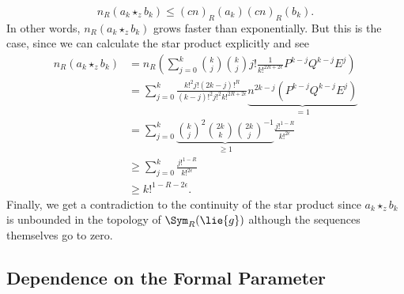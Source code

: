 \begin{example}
    \begin{equation*}
        n_R(a_k \star_z b_k)
        \leq
        (c n)_R(a_k) (c n)_R(b_k).
    \end{equation*}
    In other words, $n_R(a_k \star_z b_k)$ grows faster than
    exponentially. But this is the case, since we can calculate the star
    product explicitly and see
    \begin{align*}
        n_R(a_k \star_z b_k)
        & =
        n_R \left(
        \sum\limits_{j=0}^k
        \binom{k}{j}
        \binom{k}{j}
        j! \frac{1}{k!^{2R + 2 \epsilon}}
        P^{k-j} Q^{k-j} E^j
        \right)
        \\
        & =
        \sum\limits_{j=0}^k
        \frac{k!^2 j! (2k - j)!^R}
        {(k-j)!^2 j!^2 k!^{2R + 2 \epsilon}}
        \underbrace{
        n^{2k-j}
        ( P^{k-j} Q^{k-j} E^j )
        }_{= 1}
        \\
        & =
        \sum\limits_{j=0}^k
        \underbrace{
        \binom{k}{j}^2 \binom{2k}{k} \binom{2k}{j}^{-1}
        }_{\geq 1}
        \frac{j!^{1-R}}{k!^{2 \epsilon}}
        \\
        & \geq
        \sum\limits_{j=0}^k
        \frac{j!^{1-R}}{k!^{2 \epsilon}}
        \\
        & \geq
        k!^{1 - R - 2\epsilon}.
    \end{align*}
    Finally, we get a contradiction to the continuity of the star product 
    since $a_k \star_z b_k$ is unbounded in the topology of $\Sym_R(\lie{g})$ 
    although the sequences themselves go to zero.
\end{example}



\subsection{Dependence on the Formal Parameter}

